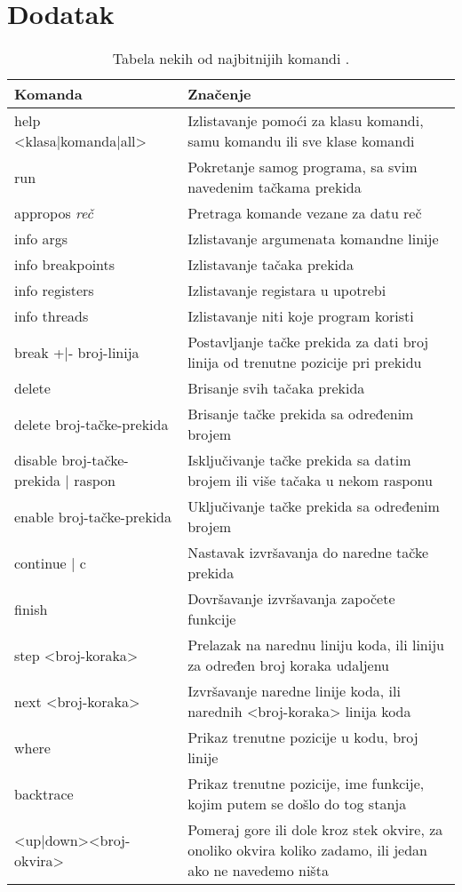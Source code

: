 \documentclass[a4paper]{article}
\begin{document}
\appendix
 


\section{Dodatak}
\label{dodatak}

\begin{table}[H]
\begin{center}
\caption{Tabela nekih od najbitnijih komandi \cite{commands}.}
\begin{tabular}{|p{4cm}|p{6cm}|} \hline
Komanda & Značenje\\ \hline
help <klasa|komanda|all> & Izlistavanje pomoći za klasu komandi, samu komandu ili sve klase komandi\\ \hline
run & Pokretanje samog programa, sa svim navedenim tačkama prekida \\ \hline
appropos \textit{reč} & Pretraga komande vezane za datu reč\\ \hline
info args & Izlistavanje argumenata komandne linije \\ \hline
info breakpoints & Izlistavanje tačaka prekida \\ \hline
info registers & Izlistavanje registara u upotrebi \\ \hline
info threads & Izlistavanje niti koje program koristi \\ \hline
break +|- broj-linija & Postavljanje tačke prekida za dati broj linija od trenutne pozicije pri prekidu \\ \hline
delete & Brisanje svih tačaka prekida \\ \hline
delete broj-tačke-prekida & Brisanje tačke prekida sa određenim brojem \\ \hline
disable broj-tačke-prekida | raspon & Isključivanje tačke prekida sa datim brojem ili više tačaka u nekom rasponu \\ \hline
enable broj-tačke-prekida & Uključivanje tačke prekida sa određenim brojem \\ \hline
continue | c & Nastavak izvršavanja do naredne tačke prekida \\ \hline
finish & Dovršavanje izvršavanja započete funkcije \\ \hline
step <broj-koraka> & Prelazak na narednu liniju koda, ili liniju za određen broj koraka udaljenu \\ \hline
next <broj-koraka> & Izvršavanje naredne linije koda, ili narednih <broj-koraka> linija koda \\ \hline
where & Prikaz trenutne pozicije u kodu, broj linije \\ \hline
backtrace & Prikaz trenutne pozicije, ime funkcije, kojim putem se došlo do tog stanja\\ \hline
<up|down><broj-okvira> & Pomeraj gore ili dole kroz stek okvire, za onoliko okvira koliko zadamo, ili jedan ako ne navedemo ništa \\ \hline
\end{tabular}
\label{tab:tabelaKonzola}
\end{center}
\end{table}
\end{document}
